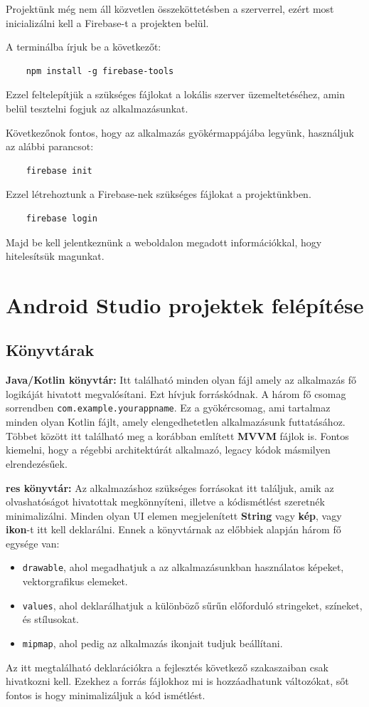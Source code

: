 Projektünk még nem áll közvetlen összeköttetésben a szerverrel, ezért most inicializálni kell a Firebase-t a projekten belül.

A terminálba írjuk be a következőt:

\begin{verbatim}
    npm install -g firebase-tools
\end{verbatim}

Ezzel feltelepítjük a szükséges fájlokat a lokális szerver üzemeltetéséhez, amin belül tesztelni fogjuk az alkalmazásunkat.

Következőnok fontos, hogy az alkalmazás gyökérmappájába legyünk, használjuk az alábbi parancsot:
\begin{verbatim}
    firebase init
\end{verbatim}

Ezzel létrehoztunk a Firebase-nek szükséges fájlokat a projektünkben.
\begin{verbatim}
    firebase login
\end{verbatim}
Majd be kell jelentkeznünk a weboldalon megadott információkkal, hogy hitelesítsük magunkat.
\section{Android Studio projektek felépítése}

\subsection{Könyvtárak}

\textbf{Java/Kotlin könyvtár:} 
Itt található minden olyan fájl amely az alkalmazás fő logikáját hivatott megvalósítani.
Ezt hívjuk forráskódnak. A három fő csomag sorrendben \texttt{com.example.yourappname}. Ez a gyökércsomag, ami tartalmaz minden olyan Kotlin fájlt, amely elengedhetetlen alkalmazásunk futtatásához. Többet között itt található meg a korábban említett \textbf{MVVM} fájlok is.
Fontos kiemelni, hogy a régebbi architektúrát alkalmazó, legacy kódok másmilyen elrendezésűek.

\textbf{res könyvtár:}
Az alkalmazáshoz szükséges forrásokat itt találjuk, amik az olvashatóságot hivatottak megkönnyíteni, illetve a kódismétlést szeretnék minimalizálni. Minden olyan UI elemen megjelenített \textbf{String} vagy \textbf{kép}, vagy \textbf{ikon}-t itt kell deklarálni.
Ennek a könyvtárnak az előbbiek alapján három fő egysége van: 
\begin{itemize}
    \item \texttt{drawable}, ahol megadhatjuk a az alkalmazásunkban használatos képeket, vektorgrafikus elemeket.
    \item \texttt{values}, ahol deklarálhatjuk a különböző sűrűn előforduló stringeket, színeket, és stílusokat.
    \item \texttt{mipmap}, ahol pedig az alkalmazás ikonjait tudjuk beállítani.
\end{itemize}
Az itt megtalálható deklarációkra a fejlesztés következő szakaszaiban csak hivatkozni kell.
Ezekhez a forrás fájlokhoz mi is hozzáadhatunk változókat, sőt fontos is hogy minimalizáljuk a kód ismétlést.


